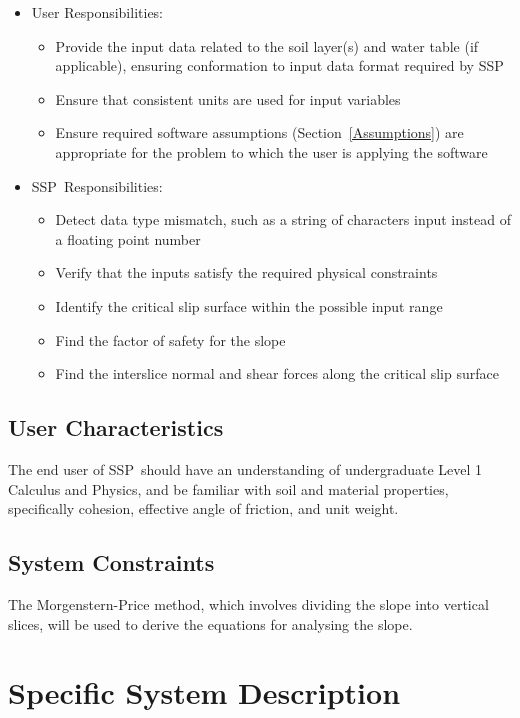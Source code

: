\documentclass[12pt]{article}
\newcommand{\progname}{SSP}
\begin{document}
\begin{itemize}
\item User Responsibilities:
  \begin{itemize}
  \item Provide the input data related to the soil layer(s) and water table (if 
  applicable), ensuring conformation to input data format required by \progname
  \item Ensure that consistent units are used for input variables
  \item Ensure required software assumptions (Section~\ref{Assumptions}) are
    appropriate for the problem to which the user is applying the software
  \end{itemize}
\item \progname\ Responsibilities:
  \begin{itemize}
  \item Detect data type mismatch, such as a string of characters input instead
    of a floating point number
  \item Verify that the inputs satisfy the required physical constraints
  \item Identify the critical slip surface within the possible input range
  \item Find the factor of safety for the slope
  \item Find the interslice normal and shear forces along the critical slip 
  surface
  \end{itemize}
\end{itemize}

\subsection{User Characteristics}
\label{Sec:UserChar}
The end user of \progname\ should have an understanding of undergraduate
Level 1 Calculus and Physics, and be familiar with soil and material
properties, specifically cohesion, effective angle of friction, and unit weight.

\subsection{System Constraints}

The Morgenstern-Price method, which involves dividing the slope into vertical 
slices, will be used to derive the equations for analysing the slope. 

\section{Specific System Description}
\end{document}
